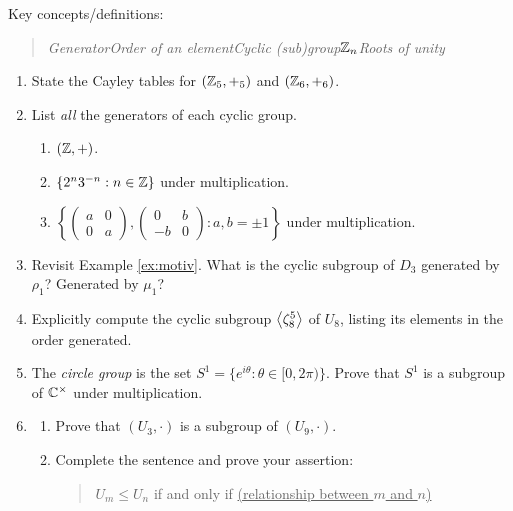 \begin{exercises}
Key concepts/definitions:
\begin{quote}
	\emph{Generator\quad Order of an element\quad Cyclic (sub)group\quad $\mathbb{Z}_n$\quad Roots of unity}
\end{quote}

\begin{enumerate}
  \item State the Cayley tables for $(\mathbb{Z}_5,+_5)$ and $(\mathbb{Z}_6,+_6)$.
  
	\item List \emph{all} the generators of each cyclic group.
  \begin{enumerate}
      \item $(\mathbb{Z},+)$.
      \item $\{2^n3^{-n}:n\in\mathbb{Z}\}$ under multiplication.
      \item $\left\{\begin{pmatrix} a&0\\0&a \end{pmatrix},\begin{pmatrix} 0&b\\-b&0 \end{pmatrix}: a,b=\pm 1\right\}$ under multiplication.
  \end{enumerate}
  

  \item Revisit Example \ref{ex:motiv}. What is the cyclic subgroup of $D_3$ generated by $\rho_1$? Generated by $\mu_1$?
  
  \item Explicitly compute the cyclic subgroup $\left\langle \zeta_8^5\right\rangle$ of $U_8$, listing its elements in the order generated. 
  
  \item\label{exs:circle} The \emph{circle group} is the set $S^1=\{e^{i\theta}:\theta\in [0,2\pi)\}$. Prove that $S^1$ is a subgroup of $\mathbb{C}^\times$ under multiplication.
  
	\item\begin{enumerate}
	  \item Prove that $(U_3,\cdot)$ is a subgroup of $(U_9,\cdot)$.
	  \item Complete the sentence and prove your assertion:
	  \begin{quote}
	  $U_m\le U_n$ if and only if \underline{\qquad\scriptsize(relationship between $m$ and $n$)\qquad}
	  \end{quote}
	\end{enumerate}
  

\end{enumerate}
\end{exercises}
